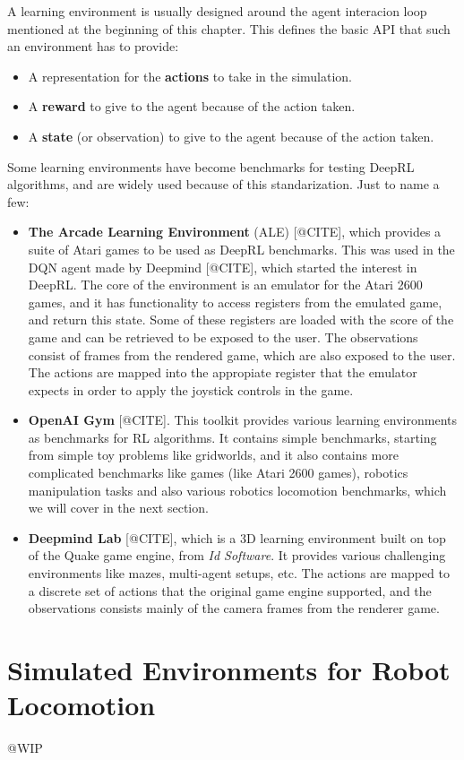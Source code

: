 A learning environment is usually designed around the agent interacion loop mentioned
at the beginning of this chapter. This defines the basic API that such an environment
has to provide:

\begin{itemize}
    \item A representation for the \textbf{actions} to take in the simulation.
    \item A \textbf{reward} to give to the agent because of the action taken.
    \item A \textbf{state} (or observation) to give to the agent because of the action taken.
\end{itemize}

Some learning environments have become benchmarks for testing DeepRL algorithms, and
are widely used because of this standarization. Just to name a few:

\begin{itemize}
    \item \textbf{The Arcade Learning Environment} (ALE) [@CITE], which provides a suite
           of Atari games to be used as DeepRL benchmarks. This was used in the DQN
           agent made by Deepmind [@CITE], which started the interest in DeepRL.
           The core of the environment is an emulator for the Atari 2600 games, and
           it has functionality to access registers from the emulated game, and return
           this state. Some of these registers are loaded with the score of the game
           and can be retrieved to be exposed to the user. The observations consist
           of frames from the rendered game, which are also exposed to the user. The actions
           are mapped into the appropiate register that the emulator expects in order
           to apply the joystick controls in the game.
    \item \textbf{OpenAI Gym} [@CITE]. This toolkit provides various learning environments
           as benchmarks for RL algorithms. It contains simple benchmarks, starting from simple
           toy problems like gridworlds, and it also contains more complicated benchmarks like
           games (like Atari 2600 games), robotics manipulation tasks and also various
           robotics locomotion benchmarks, which we will cover in the next section.
    \item \textbf{Deepmind Lab} [@CITE], which is a 3D learning environment built on top
           of the Quake game engine, from \textit{Id Software}. It provides various challenging
           environments like mazes, multi-agent setups, etc. The actions are mapped to a discrete
           set of actions that the original game engine supported, and the observations consists
           mainly of the camera frames from the renderer game.
\end{itemize}

\section{Simulated Environments for Robot Locomotion}

@WIP

